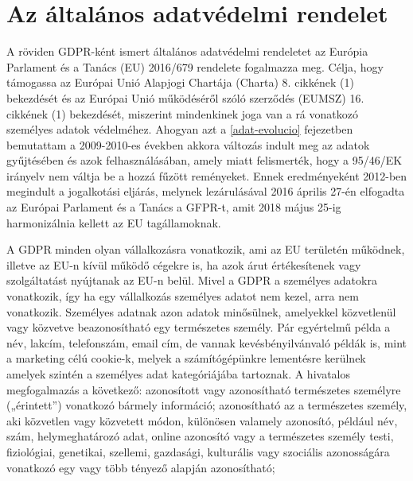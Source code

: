 \section{Az általános adatvédelmi rendelet}

A röviden GDPR-ként ismert általános adatvédelmi rendeletet az Európia Parlament és a Tanács (EU) 2016/679 rendelete fogalmazza meg. Célja, hogy támogassa az Európai Unió Alapjogi Chartája (Charta) 8. cikkének (1) bekezdését és az Európai Unió működéséről szóló szerződés (EUMSZ) 16. cikkének (1) bekezdését, miszerint mindenkinek joga van a rá vonatkozó személyes adatok védelméhez. Ahogyan azt a \ref{adat-evolucio} fejezetben bemutattam a 2009-2010-es években akkora változás indult meg az adatok gyűjtésében és azok felhasználásában, amely miatt felismerték, hogy a 95/46/EK irányelv \cite{95/46/EK} nem váltja be a hozzá fűzött reményeket. Ennek eredményeként 2012-ben megindult a jogalkotási eljárás, melynek lezárulásával 2016 április 27-én elfogadta az Európai Parlament és a Tanács a GFPR-t, amit 2018 május 25-ig harmonizálnia kellett az EU tagállamoknak.

A GDPR minden olyan vállalkozásra vonatkozik, ami az EU területén működnek, illetve az EU-n kívül működő cégekre is, ha azok árut értékesítenek vagy szolgáltatást nyújtanak az EU-n belül. Mivel a GDPR a személyes adatokra vonatkozik, így ha egy vállalkozás személyes adatot nem kezel, arra nem vonatkozik. Személyes adatnak azon adatok minősülnek, amelyekkel közvetlenül vagy közvetve beazonosítható egy természetes személy. Pár egyértelmű példa a név, lakcím, telefonszám, email cím, de vannak kevésbényilvánvaló példák is, mint a marketing célú cookie-k, melyek a számítógépünkre lementésre kerülnek amelyek szintén a személyes adat kategóriájába tartoznak. A hivatalos megfogalmazás a következő: azonosított vagy azonosítható természetes személyre („érintett”) vonatkozó bármely információ; azonosítható az a természetes személy, aki közvetlen vagy közvetett módon, különösen valamely azonosító, például név, szám, helymeghatározó adat, online azonosító vagy a természetes személy testi, fiziológiai, genetikai, szellemi, gazdasági, kulturális vagy szociális azonosságára vonatkozó egy vagy több tényező alapján azonosítható;

